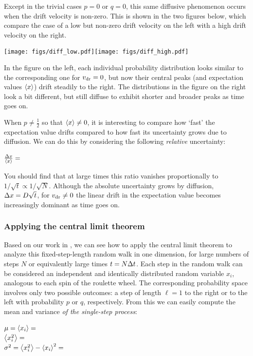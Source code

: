 Except in the trivial cases $p = 0$ or $q = 0$, this same diffusive phenomenon occurs when the drift velocity is non-zero.
This is shown in the two figures below, which compare the case of a low but non-zero drift velocity on the left with a high drift velocity on the right. \\
\begin{center} %
  \texttt{[image: figs/diff\_low.pdf]}\hfill \texttt{[image: figs/diff\_high.pdf]}
\end{center}
In the figure on the left, each individual probability distribution looks similar to the corresponding one for $v_{\mathrm{dr}} = 0$, but now their central peaks (and expectation values $\left\langle x \right\rangle$) drift steadily to the right.
The distributions in the figure on the right look a bit different, but still diffuse to exhibit shorter and broader peaks as time goes on.

When $p \neq \frac{1}{2}$ so that $\left\langle x \right\rangle \neq 0$, it is interesting to compare how `fast' the expectation value drifts compared to how fast its uncertainty grows due to diffusion.
We can do this by considering the following \textit{relative} uncertainty:
\begin{mdframed}
  $\frac{\Delta x}{\left\langle x \right\rangle} = $ \\[100 pt]
\end{mdframed}
You should find that at large times this ratio vanishes proportionally to $1 / \sqrt{t} \propto 1 / \sqrt{N}$.
Although the absolute uncertainty grows by diffusion, $\Delta x = D \sqrt{t}$, for $v_{\mathrm{dr}} \neq 0$ the linear drift in the expectation value becomes increasingly dominant as time goes on.



\subsubsection{\label{sec:RW_CLT}Applying the central limit theorem}
Based on our work in , we can see how to apply the central limit theorem to analyze this fixed-step-length random walk in one dimension, for large numbers of steps $N$ or equivalently large times $t = N \Delta t$.
Each step in the random walk can be considered an independent and identically distributed random variable $x_i$, analogous to each spin of the roulette wheel.
The corresponding probability space involves only two possible outcomes: a step of length $\ell = 1$ to the right or to the left with probability $p$ or $q$, respectively.
From this we can easily compute the mean and variance \textit{of the single-step process}:
\begin{mdframed}
  $\mu = \left\langle x_i \right\rangle = $ \\[33 pt]
  $\left\langle x_i^2 \right\rangle = $ \\[33 pt]
  $\sigma^2 = \left\langle x_i^2 \right\rangle - \left\langle x_i \right\rangle^2 = $ \\[30 pt]
\end{mdframed}

